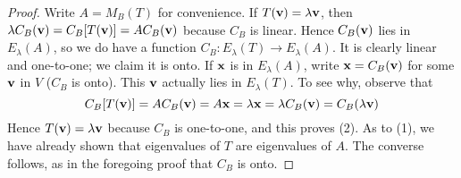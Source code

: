 \begin{proof}
Write $A = M_{B}(T)$ for convenience. If $T(\textbf{v}) = \lambda\textbf{v}$, then ${\lambda}C_{B}(\textbf{v}) = C_{B}[T(\textbf{v})] = AC_{B}(\textbf{v})$ because $C_{B}$ is linear. Hence $C_{B}(\textbf{v})$ lies in $E_{\lambda}(A)$, so we do have a function $C_{B} : E_{\lambda}(T) \to E_{\lambda}(A)$. It is clearly linear and one-to-one; we claim it is onto. If $\textbf{x}$ is in $E_{\lambda}(A)$, write $\textbf{x} = C_{B}(\textbf{v})$ for some $\textbf{v}$ in $V$ ($C_{B}$ is onto). This $\textbf{v}$ actually lies in $E_{\lambda}(T)$. To see why, observe that
\begin{equation*}
C_B[T(\textbf{v})] = AC_B(\textbf{v}) = A\textbf{x} = \lambda\textbf{x} = {\lambda}C_B(\textbf{v}) = C_B(\lambda\textbf{v})
\end{equation*}
Hence $T(\textbf{v}) = \lambda\textbf{v}$ because $C_{B}$ is one-to-one, and this proves (2). As to (1), we have already shown that eigenvalues of $T$ are eigenvalues of $A$. The converse follows, as in the foregoing proof that $C_{B}$ is onto.
\end{proof}

